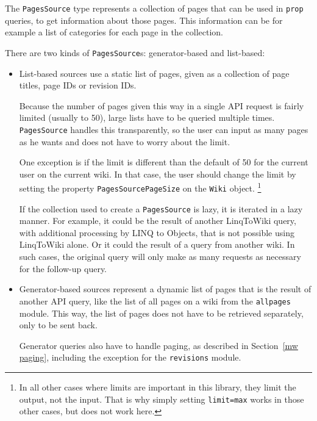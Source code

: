The \lstinline{PagesSource} type represents a collection of pages that can be used in \texttt{prop} queries,
to get information about those pages.
This information can be for example a list of categories for each page in the collection.

There are two kinds of \lstinline{PagesSource}s: generator-based and list-based:

\begin{itemize}

\item List-based sources use a static list of pages, given as a collection of page titles, page IDs or revision IDs.

Because the number of pages given this way in a single \ac{API} request is fairly limited (usually to 50),
large lists have to be queried multiple times.
\lstinline{PagesSource} handles this transparently, so the user can input as many pages as he wants and does not have to worry about the limit.

One exception is if the limit is different than the default of 50 for the current user on the current wiki.
In that case, the user should change the limit by setting the property \lstinline{PagesSourcePageSize} on the \lstinline{Wiki} object.%
\footnote{In all other cases where limits are important in this library, they limit the output, not the input.
That is why simply setting \texttt{limit=max} works in those other cases, but does not work here.}

If the collection used to create a \lstinline{PagesSource} is lazy, it is iterated in a lazy manner.
For example, it could be the result of another LinqToWiki query, with additional processing by \ac{LINQ} to Objects,
that is not possible using LinqToWiki alone.
Or it could the result of a query from another wiki.
In such cases, the original query will only make as many requests as necessary for the follow-up query.

\item Generator-based sources represent a dynamic list of pages that is the result of another \ac{API} query,
like the list of all pages on a wiki from the \texttt{allpages} module.
This way, the list of pages does not have to be retrieved separately, only to be sent back.

Generator queries also have to handle paging, as described in Section~\ref{mw paging},
including the exception for the \texttt{revisions} module.

\end{itemize}

